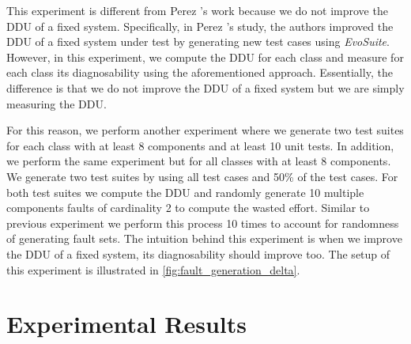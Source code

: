 \documentclass[twoside,a4paper,11pt]{memoir}
\begin{document}
This experiment is different from Perez \etal's work because we do not improve the DDU of a fixed system.
Specifically, in Perez \etal's study, the authors improved the DDU of a fixed system under test by generating new test cases using \emph{EvoSuite}.
However, in this experiment, we compute the DDU for each class and measure for each class its diagnosability using the aforementioned approach.
Essentially, the difference is that we do not improve the DDU of a fixed system but we are simply measuring the DDU.



For this reason, we perform another experiment where we generate two test suites for each class with at least 8 components and at least 10 unit tests.
In addition, we perform the same experiment but for all classes with at least 8 components.
We generate two test suites by using all test cases and 50\% of the test cases.
For both test suites we compute the DDU and randomly generate 10 multiple components faults of cardinality 2 to compute the wasted effort.
Similar to previous experiment we perform this process 10 times to account for randomness of generating fault sets.
The intuition behind this experiment is when we improve the DDU of a fixed system, its diagnosability should improve too.
The setup of this experiment is illustrated in \autoref{fig:fault_generation_delta}.

\section{Experimental Results}
\label{sec:rq2_experimental_results}
\end{document}
